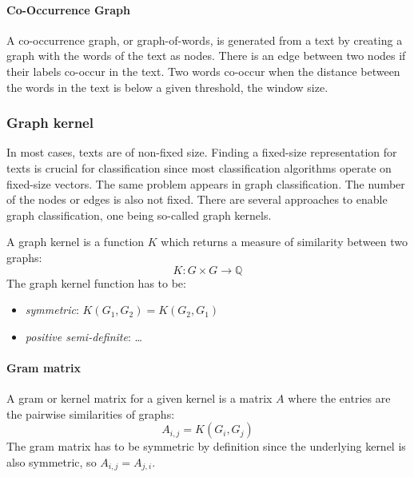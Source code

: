 \paragraph{Co-Occurrence Graph}
A co-occurrence graph, or graph-of-words, is generated from a text by creating a graph with the words of the text as nodes.
There is an edge between two nodes if their labels co-occur in the text.
Two words co-occur when the distance between the words in the text is below a given threshold, the window size.

\subsubsection{Graph kernel}

In most cases, texts are of non-fixed size. Finding a fixed-size representation for texts is crucial for classification since most classification algorithms operate on fixed-size vectors.
The same problem appears in graph classification. The number of the nodes or edges is also not fixed.
There are several approaches to enable graph classification, one being so-called graph kernels.

A graph kernel is a function $K$ which returns a measure of similarity between two graphs:
\begin{equation*}
K: G \times G \rightarrow \mathbb{Q}
\end{equation*}
The graph kernel function has to be:
\begin{itemize}
    \item{\textit{symmetric}: $K(G_1, G_2) = K(G_2, G_1)$}
    \item{\textit{positive semi-definite}: \dots}
\end{itemize}



\paragraph{Gram matrix}
A gram or kernel matrix for a given kernel is a matrix $A$ where the entries are the pairwise similarities of graphs:
\begin{equation*}
    A_{i,j} = K(G_i, G_j)
\end{equation*}
The gram matrix has to be symmetric by definition since the underlying kernel is also symmetric, so $A_{i,j} = A_{j, i}$.
